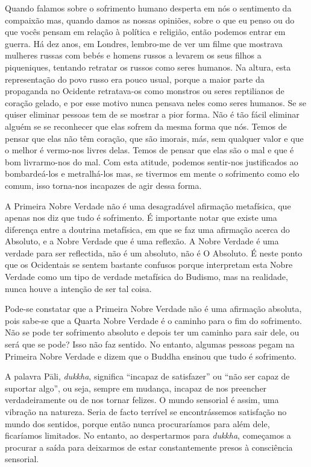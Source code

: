 Quando falamos sobre o sofrimento humano desperta em nós o sentimento da
compaixão mas, quando damos as nossas opiniões, sobre o que eu penso ou do que
vocês pensam em relação à política e religião, então podemos entrar em guerra.
Há dez anos, em Londres, lembro-me de ver um filme que mostrava mulheres russas
com bebés e homens russos a levarem os seus filhos a piqueniques, tentando
retratar os russos como seres humanos. Na altura, esta representação do povo
russo era pouco usual, porque a maior parte da propaganda no Ocidente
retratava-os como monstros ou seres reptilianos de coração gelado, e por esse
motivo nunca pensava neles como seres humanos. Se se quiser eliminar pessoas tem
de se mostrar a pior forma. Não é tão fácil eliminar alguém se se reconhecer que
elas sofrem da mesma forma que nós. Temos de pensar que elas não têm coração,
que são imorais, más, sem qualquer valor e que o melhor é vermo-nos livres
delas. Temos de pensar que elas são o mal e que é bom livrarmo-nos do mal. Com
esta atitude, podemos sentir-nos justificados ao bombardeá-los e metralhá-los
mas, se tivermos em mente o sofrimento como elo comum, isso torna-nos incapazes
de agir dessa forma.

A Primeira Nobre Verdade não é uma desagradável afirmação metafísica, que apenas
nos diz que tudo é sofrimento. É importante notar que existe uma diferença entre
a doutrina metafísica, em que se faz uma afirmação acerca do Absoluto, e a Nobre
Verdade que é uma reflexão. A Nobre Verdade é uma verdade para ser reflectida,
não é um absoluto, não é O Absoluto. É neste ponto que os Ocidentais se sentem
bastante confusos porque interpretam esta Nobre Verdade como um tipo de verdade
metafísica do Budismo, mas na realidade, nunca houve a intenção de ser tal
coisa.

Pode-se constatar que a Primeira Nobre Verdade não é uma afirmação absoluta,
pois sabe-se que a Quarta Nobre Verdade é o caminho para o fim do sofrimento.
Não se pode ter sofrimento absoluto e depois ter um caminho para sair dele, ou
será que se pode? Isso não faz sentido. No entanto, algumas pessoas pegam na
Primeira Nobre Verdade e dizem que o Buddha ensinou que tudo é sofrimento.

A palavra Pāli, \emph{dukkha}, significa “incapaz de satisfazer” ou “não ser
capaz de suportar algo”, ou seja, sempre em mudança, incapaz de nos preencher
verdadeiramente ou de nos tornar felizes. O mundo sensorial é assim, uma
vibração na natureza. Seria de facto terrível se encontrássemos satisfação no
mundo dos sentidos, porque então nunca procuraríamos para além dele, ficaríamos
limitados. No entanto, ao despertarmos para \emph{dukkha}, começamos a procurar
a saída para deixarmos de estar constantemente presos à consciência sensorial.

